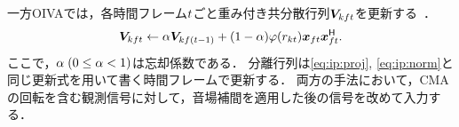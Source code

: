 \documentclass{article}
\begin{document}
一方OIVAでは，各時間フレーム$t$ごと重み付き共分散行列$\bm{V} _{kft}$を更新する~\cite{Taniguchi:2014:HSCMA}．
\begin{equation}
  \bm{V} _{kft} \gets \alpha \bm{V} _{kf(t-1)} + (1 - \alpha) \varphi ({r _{kt}}) \bm{x} _{ft} \bm{x} _{ft}^{\mathsf{H}}.
\end{equation}
ここで，$\alpha\; (0 \leq \alpha < 1)$は忘却係数である．
分離行列は\cref{eq:ip:proj}, \cref{eq:ip:norm}と同じ更新式を用いて書く時間フレームで更新する．
両方の手法において，CMAの回転を含む観測信号に対して，音場補間を適用した後の信号を改めて入力する．



\end{document}
